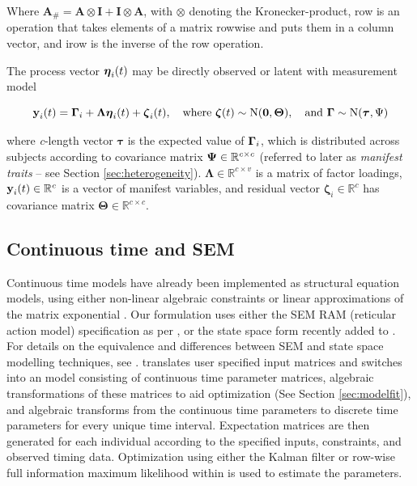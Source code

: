 \documentclass[nojss]{jss}\usepackage[]{graphicx}\usepackage[]{color}
\begin{document}
Where $\textbf{A}_{\#} = \textbf{A} \otimes \textbf{I} + \textbf{I} \otimes \textbf{A} $, with $\otimes$ denoting the Kronecker-product, row is an operation that takes elements of a matrix rowwise and puts them in a column vector, and irow is the inverse of the row operation.

The process vector $\boldsymbol{\eta}_\mathnormal{i}(\mathnormal{t})$ may be directly observed or latent with measurement model

\begin{equation}
\label{eq:measurement}
\mathrm{\textbf{y}_\mathnormal{i} \mathnormal{(t)} = \boldsymbol{\Gamma}_\mathnormal{i} + \boldsymbol{\Lambda} \boldsymbol{\eta}_\mathnormal{i} ( \mathnormal{t} ) + \boldsymbol{\zeta}_\mathnormal{i}\mathnormal{(t)},  
\quad \text{where } \boldsymbol{\zeta}\mathnormal{(t)} \sim  \mathrm{N} ( \textbf{0} , \boldsymbol{\Theta} ) ,
\quad \text{and } \boldsymbol{\Gamma} \sim  \mathrm{N} ( \boldsymbol{\tau} , \Psi ) }
\end{equation}

where \textit{c}-length vector $\boldsymbol{\tau}$ is the expected value of $\boldsymbol{\Gamma}_\mathnormal{i}$, which is distributed across subjects according to covariance matrix $\boldsymbol{\Psi} \in \mathbb{R}^{\mathnormal{c \times c}}$ (referred to later as \textit{manifest traits} -- see Section \ref{sec:heterogeneity}). $\boldsymbol{\Lambda} \in \mathbb{R}^{c \times v}$ is a matrix of factor loadings, $\textbf{y}_\mathnormal{i} (\mathnormal{t})\in\mathbb{R}^{c}$ is a vector of manifest variables, and residual vector $\boldsymbol{\zeta}_i \in \mathbb{R}^{c}$ has covariance matrix $\boldsymbol{\Theta} \in\mathbb{R}^{c \times c}$.

\subsection{Continuous time and SEM}\nopagebreak
Continuous time models have already been implemented as structural equation models, using either non-linear algebraic constraints \citep{oud2000continuous} or linear approximations of the matrix exponential \citep{oud2002continuous}. Our formulation uses either the SEM RAM (reticular action model) specification as per \citet{mcardle1984algebraic}, or the state space form recently added to  \citep{neale2015openmx, hunter2014state}. For details on the equivalence and differences between SEM and state space modelling techniques, see \citet{chow2010equivalence}.  translates user specified input matrices and switches into an  model consisting of continuous time parameter matrices, algebraic transformations of these matrices to aid optimization (See Section \ref{sec:modelfit}), and algebraic transforms from the continuous time parameters to discrete time parameters for every unique time interval. Expectation matrices are then generated for each individual according to the specified inputs, constraints, and observed timing data. Optimization using either the Kalman filter or row-wise full information maximum likelihood within  is used to estimate the parameters.
\end{document}
